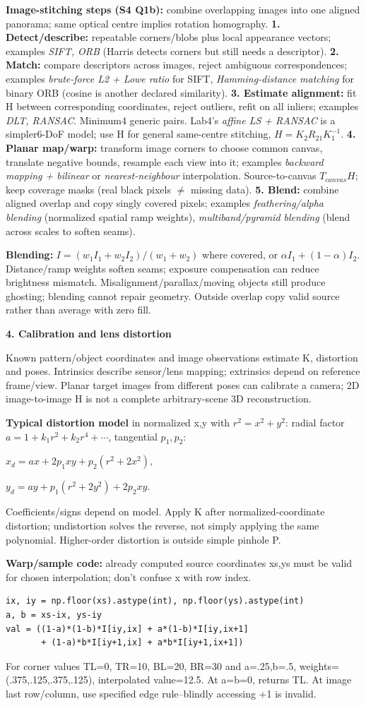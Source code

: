 \documentclass[a4paper]{article}
\newcommand{\key}[1]{\textbf{#1}}
\newcommand{\Topic}[1]{\par\vspace{1.7pt}\noindent
  {\fontsize{7.7}{8.0}\selectfont\bfseries #1}\par\vspace{0.3pt}}
\newcommand{\eq}[1]{\par\noindent\mbox{\(\displaystyle #1\)}\par}
\newcommand{\inv}{^{-1}}
\newcounter{sheet}
\newcounter{sheetcolumn}
\newlength{\colwidth}
\newenvironment{sheetcol}[1][7.0]{\stepcounter{sheetcolumn}
  \begin{lrbox}{\columnbox}\begin{minipage}[t]{\colwidth}\vspace{0pt}
  \fontsize{#1}{\dimexpr#1pt+0.6pt\relax}\selectfont}
  {\end{minipage}\end{lrbox}
  \typeout{CV1COL|\thesheet|\thesheetcolumn|\the\dimexpr\ht\columnbox+\dp\columnbox\relax}
  \usebox{\columnbox}\ignorespacesafterend}
\newcommand{\Sep}{\hfill}
\begin{document}
\begin{sheetcol}[6.7]
\key{Image-stitching steps (S4 Q1b):} combine overlapping images into one aligned panorama; same optical centre implies rotation homography.
\key{1. Detect/describe:} repeatable corners/blobs plus local appearance vectors; examples \emph{SIFT, ORB} (Harris detects corners but still needs a descriptor).
\key{2. Match:} compare descriptors across images, reject ambiguous correspondences; examples \emph{brute-force L2 + Lowe ratio} for SIFT, \emph{Hamming-distance matching} for binary ORB (cosine is another declared similarity).
\key{3. Estimate alignment:} fit H between corresponding coordinates, reject outliers, refit on all inliers; examples \emph{DLT, RANSAC}. Minimum4 generic pairs. Lab4's \emph{affine LS + RANSAC} is a simpler6-DoF model; use H for general same-centre stitching, \(H=K_2R_{21}K_1\inv\).
\key{4. Planar map/warp:} transform image corners to choose common canvas, translate negative bounds, resample each view into it; examples \emph{backward mapping + bilinear} or \emph{nearest-neighbour} interpolation. Source-to-canvas \(T_{canvas}H\); keep coverage masks (real black pixels \(\ne\) missing data).
\key{5. Blend:} combine aligned overlap and copy singly covered pixels; examples \emph{feathering/alpha blending} (normalized spatial ramp weights), \emph{multiband/pyramid blending} (blend across scales to soften seams).

\key{Blending:} \(I=(w_1I_1+w_2I_2)/(w_1+w_2)\) where covered, or \(\alpha I_1+(1-\alpha)I_2\). Distance/ramp weights soften seams; exposure compensation can reduce brightness mismatch. Misalignment/parallax/moving objects still produce ghosting; blending cannot repair geometry. Outside overlap copy valid source rather than average with zero fill.

\Topic{4. Calibration and lens distortion}
Known pattern/object coordinates and image observations estimate K, distortion and poses. Intrinsics describe sensor/lens mapping; extrinsics depend on reference frame/view. Planar target images from different poses can calibrate a camera; 2D image-to-image H is not a complete arbitrary-scene 3D reconstruction.

\key{Typical distortion model} in normalized x,y with \(r^2=x^2+y^2\): radial factor \(a=1+k_1r^2+k_2r^4+\cdots\), tangential \(p_1,p_2\):
\eq{x_d=ax+2p_1xy+p_2(r^2+2x^2),}
\eq{y_d=ay+p_1(r^2+2y^2)+2p_2xy.}
Coefficients/signs depend on model. Apply K after normalized-coordinate distortion; undistortion solves the reverse, not simply applying the same polynomial. Higher-order distortion is outside simple pinhole P.

\key{Warp/sample code:} already computed source coordinates xs,ys must be valid for chosen interpolation; don't confuse x with row index.
\begin{lstlisting}
ix, iy = np.floor(xs).astype(int), np.floor(ys).astype(int)
a, b = xs-ix, ys-iy
val = ((1-a)*(1-b)*I[iy,ix] + a*(1-b)*I[iy,ix+1]
       + (1-a)*b*I[iy+1,ix] + a*b*I[iy+1,ix+1])
\end{lstlisting}
For corner values TL=0, TR=10, BL=20, BR=30 and a=.25,b=.5, weights=(.375,.125,.375,.125), interpolated value=12.5. At a=b=0, returns TL. At image last row/column, use specified edge rule--blindly accessing +1 is invalid.
\end{sheetcol}\Sep
\end{document}
